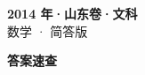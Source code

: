 \documentclass[zihao=-4, a4paper]{ctexart}
\begin{document}
\begin{center}
  {\Large\bfseries 2014 年·山东卷·文科}\\[4pt]
  {\large 数学 · 简答版}
\end{center}
\medskip
{}

\clearpage
{}
\begin{center}{\Large\bfseries 答案速查}\end{center}
\medskip

\end{document}
